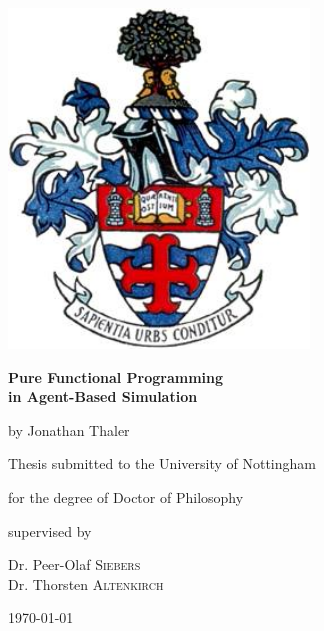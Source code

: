\documentclass[oneside]{book}
\begin{document}
\begin{titlepage}
	\centering
	\includegraphics[width=0.60\textwidth]{./logo/coat_of_arms.jpg}\par\vspace{1cm}
	\vspace{1.5cm}
	{\huge\bfseries Pure Functional Programming \\ in Agent-Based Simulation \par}
	\vspace{2cm}
	{\Large by Jonathan Thaler \par}
	\vfill
	Thesis submitted to the University of Nottingham \par
	for the degree of Doctor of Philosophy \par
	
	\vfill
	
	\small
	supervised by\par
	Dr. Peer-Olaf \textsc{Siebers} \\
	Dr. Thorsten \textsc{Altenkirch}

	\vfill
	{\large \today\par}
\end{titlepage}
\end{document}
